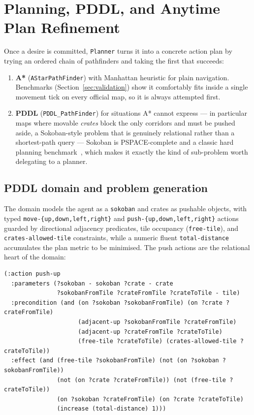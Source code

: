\section{Planning, PDDL, and Anytime Plan Refinement}
\label{sec:planning}

Once a desire is committed, \texttt{Planner} turns it into a concrete action plan by trying an
ordered chain of pathfinders and taking the first that succeeds:

\begin{enumerate}
    \item \textbf{A*} (\texttt{AStarPathFinder}) with Manhattan heuristic for plain navigation.
    Benchmarks (Section~\ref{sec:validation}) show it comfortably fits inside a single movement
    tick on every official map, so it is always attempted first.
    \item \textbf{PDDL} (\texttt{PDDL\_PathFinder}) for situations A* cannot express ---
    in particular maps where movable \emph{crates} block the only corridors and must be pushed
    aside, a Sokoban-style problem that is genuinely relational rather than a shortest-path
    query --- Sokoban is PSPACE-complete and a classic hard planning
    benchmark~\cite{virkkala2011,peters2023}, which makes it exactly the kind of sub-problem
    worth delegating to a planner.
\end{enumerate}

\subsection{PDDL domain and problem generation}
The domain models the agent as a \texttt{sokoban} and crates as pushable objects, with typed
\texttt{move-\{up,down,left,right\}} and \texttt{push-\{up,down,left,right\}} actions guarded by
directional adjacency predicates, tile occupancy (\texttt{free-tile}), and
\texttt{crates-allowed-tile} constraints, while a numeric fluent \texttt{total-distance}
accumulates the plan metric to be minimised. The push actions are the relational heart of the domain:

\begin{lstlisting}
(:action push-up
  :parameters (?sokoban - sokoban ?crate - crate
               ?sokobanFromTile ?crateFromTile ?crateToTile - tile)
  :precondition (and (on ?sokoban ?sokobanFromTile) (on ?crate ?crateFromTile)
                     (adjacent-up ?sokobanFromTile ?crateFromTile)
                     (adjacent-up ?crateFromTile ?crateToTile)
                     (free-tile ?crateToTile) (crates-allowed-tile ?crateToTile))
  :effect (and (free-tile ?sokobanFromTile) (not (on ?sokoban ?sokobanFromTile))
               (not (on ?crate ?crateFromTile)) (not (free-tile ?crateToTile))
               (on ?sokoban ?crateFromTile) (on ?crate ?crateToTile)
               (increase (total-distance) 1)))
\end{lstlisting}


